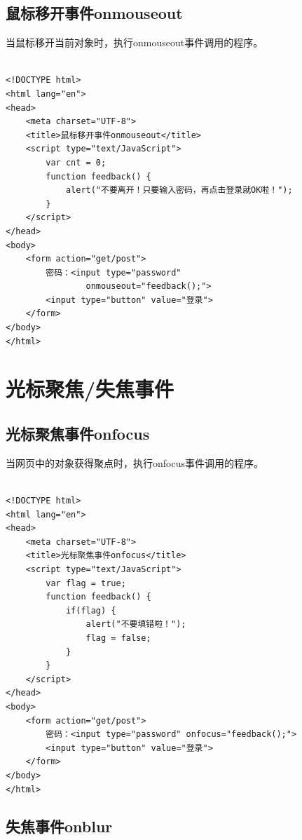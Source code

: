 \subsection{鼠标移开事件onmouseout}

当鼠标移开当前对象时，执行onmouseout事件调用的程序。 \\

 \\

\begin{lstlisting}[style=htmlcssjs]
<!DOCTYPE html>
<html lang="en">
<head>
    <meta charset="UTF-8">
    <title>鼠标移开事件onmouseout</title>
    <script type="text/JavaScript">
        var cnt = 0;
        function feedback() {
            alert("不要离开！只要输入密码，再点击登录就OK啦！");
        }
    </script>
</head>
<body>
    <form action="get/post">
        密码：<input type="password"
                onmouseout="feedback();">
        <input type="button" value="登录">
    </form>
</body>
</html>
\end{lstlisting}

\newpage

\section{光标聚焦/失焦事件}

\subsection{光标聚焦事件onfocus}

当网页中的对象获得聚点时，执行onfocus事件调用的程序。 \\

 \\

\begin{lstlisting}[style=htmlcssjs]
<!DOCTYPE html>
<html lang="en">
<head>
    <meta charset="UTF-8">
    <title>光标聚焦事件onfocus</title>
    <script type="text/JavaScript">
        var flag = true;
        function feedback() {
            if(flag) {
                alert("不要填错啦！");
                flag = false;
            }
        }
    </script>
</head>
<body>
    <form action="get/post">
        密码：<input type="password" onfocus="feedback();">
        <input type="button" value="登录">
    </form>
</body>
</html>
\end{lstlisting}

\subsection{失焦事件onblur}

